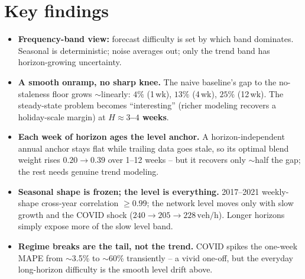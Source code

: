 \documentclass[11pt]{article}
\newcommand{\veh}{\,\text{veh/h}}
\begin{document}
\section*{Key findings}
\begin{itemize}
\item \textbf{Frequency-band view:} forecast difficulty is set by which band
  dominates. Seasonal is deterministic; noise averages out; only the trend band
  has horizon-growing uncertainty.
\item \textbf{A smooth onramp, no sharp knee.} The naive baseline's gap to the
  no-staleness floor grows $\sim$linearly: $4\%$ (1\,wk), $13\%$ (4\,wk), $25\%$
  (12\,wk). The steady-state problem becomes ``interesting'' (richer modeling
  recovers a holiday-scale margin) at \textbf{$H\approx3$--$4$ weeks}.
\item \textbf{Each week of horizon ages the level anchor.} A horizon-independent
  annual anchor stays flat while trailing data goes stale, so its optimal blend
  weight rises $0.20{\to}0.39$ over 1--12 weeks -- but it recovers only $\sim$half
  the gap; the rest needs genuine trend modeling.
\item \textbf{Seasonal shape is frozen; the level is everything.} 2017--2021
  weekly-shape cross-year correlation $\ge0.99$; the network level moves only with
  slow growth and the COVID shock ($240{\to}205{\to}228\veh$). Longer horizons
  simply expose more of the slow level band.
\item \textbf{Regime breaks are the tail, not the trend.} COVID spikes the
  one-week MAPE from $\sim$3.5\% to $\sim$60\% transiently -- a vivid one-off, but
  the everyday long-horizon difficulty is the smooth level drift above.
\end{itemize}
\end{document}
